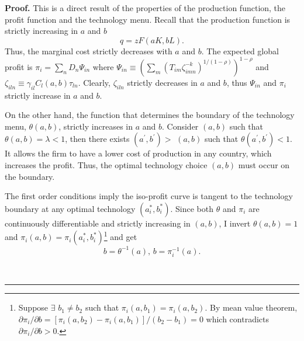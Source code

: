 \documentclass[notitlepage,11pt]{article}%
\newenvironment{proof}[1][Proof]{\noindent \textbf{#1.} }{\  \rule{0.5em}{0.5em}}
\begin{document}
\begin{proof}
This is a direct result of the properties of the production function, the
profit function and the technology menu. Recall that the production function
is strictly increasing in $a$ and $b$%
\[
q=zF\left(  aK,bL\right)  .
\]
Thus, the marginal cost strictly decreases with $a$ and $b$. The expected
global profit is $\pi_{i}=\sum_{n}D_{n}\Psi_{in}$ where $\Psi_{in}%
\equiv\left(  \sum_{m}\left(  T_{im}\zeta_{imn}^{-k}\right)  ^{1/\left(
1-\rho\right)  }\right)  ^{1-\rho}$ and $\zeta_{iln}\equiv\gamma_{il}%
C_{l}\left(  a,b\right)  \tau_{ln}$. Clearly, $\zeta_{iln}$ strictly decreases
in $a$ and $b$, thus $\Psi_{in}$ and $\pi_{i}$ strictly increase in $a$ and
$b$.

On the other hand, the function that determines the boundary of the technology
menu, $\theta\left(  a,b\right)  $, strictly increases in $a$ and $b$.
Consider $\left(  a,b\right)  $ such that $\theta\left(  a,b\right)
=\lambda<1$, then there exists $\left(  a^{\prime},b^{\prime}\right)  >$
$\left(  a,b\right)  $ such that $\theta\left(  a^{\prime},b^{\prime}\right)
<1$. It allows the firm to have a lower cost of production in any country,
which increases the profit. Thus, the optimal technology choice $\left(
a,b\right)  $ must occur on the boundary.

The first order conditions imply the iso-profit curve is tangent to the
technology boundary at any optimal technology $\left(  a_{i}^{\ast}%
,b_{i}^{\ast}\right)  $. Since both $\theta$ and $\pi_{i}$ are continuously
differentiable and strictly increasing in $\left(  a,b\right)  $, I invert
$\theta\left(  a,b\right)  =1$ and $\pi_{i}\left(  a,b\right)  =\pi_{i}\left(
a_{i}^{\ast},b_{i}^{\ast}\right)  $\footnote{Suppose $\exists$ $b_{1}\neq
b_{2}$ such that $\pi_{i}\left(  a,b_{1}\right)  =\pi_{i}\left(
a,b_{2}\right)  $. By mean value theorem, $\partial\pi_{i}/\partial b=\left[
\pi_{i}\left(  a,b_{2}\right)  -\pi_{i}\left(  a,b_{1}\right)  \right]
/\left(  b_{2}-b_{1}\right)  =0$ which contradicts $\partial\pi_{i}/\partial
b>0$.} and get%
\[
b=\theta^{-1}\left(  a\right)  ,\,b=\pi_{i}^{-1}\left(  a\right)  .
\]



\end{proof}
\end{document}
